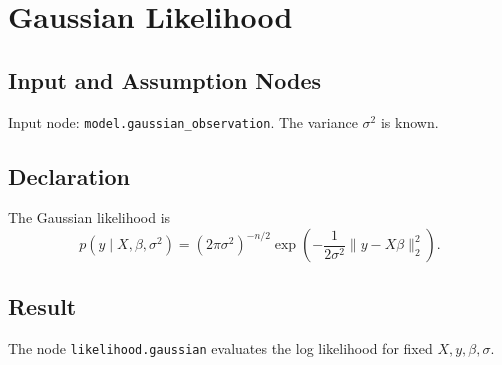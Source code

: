 \section{Gaussian Likelihood}
\label{likelihood:gaussian}

\subsection{Input and Assumption Nodes}
Input node: \texttt{model.gaussian\_observation}. The variance \(\sigma^2\) is known.

\subsection{Declaration}
The Gaussian likelihood is
\[
  p(y\mid X,\beta,\sigma^2)
  =
  (2\pi\sigma^2)^{-n/2}
  \exp\left(-\frac{1}{2\sigma^2}\|y-X\beta\|_2^2\right).
\]

\subsection{Result}
The node \texttt{likelihood.gaussian} evaluates the log likelihood for fixed \(X,y,\beta,\sigma\).

